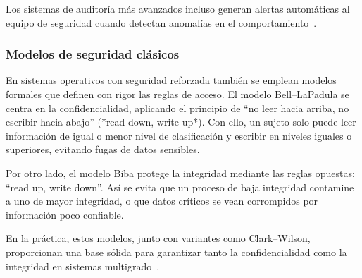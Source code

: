 Los sistemas de auditoría más avanzados incluso generan alertas automáticas al equipo de seguridad cuando detectan anomalías en el comportamiento~\citep{ibm2019}.

\subsubsection{Modelos de seguridad clásicos}
En sistemas operativos con seguridad reforzada también se emplean modelos formales que definen con rigor las reglas de acceso.  
El modelo Bell–LaPadula se centra en la confidencialidad, aplicando el principio de “no leer hacia arriba, no escribir hacia abajo” (*read down, write up*).  
Con ello, un sujeto solo puede leer información de igual o menor nivel de clasificación y escribir en niveles iguales o superiores, evitando fugas de datos sensibles.  

Por otro lado, el modelo Biba protege la integridad mediante las reglas opuestas: “read up, write down”.  
Así se evita que un proceso de baja integridad contamine a uno de mayor integridad, o que datos críticos se vean corrompidos por información poco confiable.  

En la práctica, estos modelos, junto con variantes como Clark–Wilson, proporcionan una base sólida para garantizar tanto la confidencialidad como la integridad en sistemas multigrado~\citep{columbia2008}.

